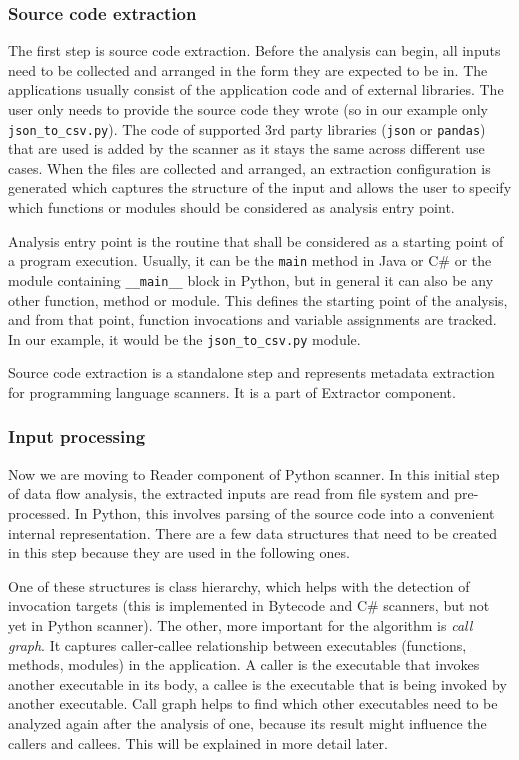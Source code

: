 \subsubsection{Source code extraction}

The first step is source code extraction. Before the analysis can begin, all inputs need to be collected and arranged in the form they are expected to be in. The applications usually consist of the application code and of external libraries. The user only needs to provide the source code they wrote (so in our example only \texttt{json\_to\_csv.py}). The code of supported 3rd party libraries (\texttt{json} or \texttt{pandas}) that are used is added by the scanner as it stays the same across different use cases. When the files are collected and arranged, an extraction configuration is generated which captures the structure of the input and allows the user to specify which functions or modules should be considered as analysis entry point.
\par
Analysis entry point is the routine that shall be considered as a starting point of a program execution. Usually, it can be the \texttt{main} method in Java or C\# or the module containing \texttt{\_\_main\_\_} block in Python, but in general it can also be any other function, method or module. This defines the starting point of the analysis, and from that point, function invocations and variable assignments are tracked. In our example, it would be the \texttt{json\_to\_csv.py} module.
\par
Source code extraction is a standalone step and represents metadata extraction for programming language scanners. It is a part of Extractor component.

\subsubsection{Input processing}

Now we are moving to Reader component of Python scanner. In this initial step of data flow analysis, the extracted inputs are read from file system and pre-processed. In Python, this involves parsing of the source code into a convenient internal representation. There are a few data structures that need to be created in this step because they are used in the following ones.
\par
One of these structures is class hierarchy, which helps with the detection of invocation targets (this is implemented in Bytecode and C\# scanners, but not yet in Python scanner). The other, more important for the algorithm is \textit{call graph}. It captures caller-callee relationship between executables (functions, methods, modules) in the application. A caller is the executable that invokes another executable in its body, a callee is the executable that is being invoked by another executable. Call graph helps to find which other executables need to be analyzed again after the analysis of one, because its result might influence the callers and callees. This will be explained in more detail later.

